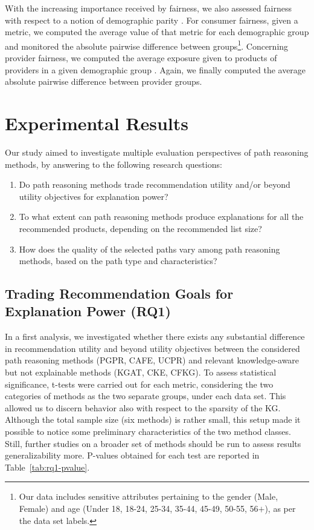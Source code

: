 \documentclass[runningheads]{llncs}
\begin{document}
With the increasing importance received by fairness, we also assessed fairness with respect to a notion of demographic parity \cite{10.1007/978-3-030-99736-6_37,DBLP:conf/sigir/GomezZBSM21}. 
For consumer fairness, given a metric, we computed the average value of that metric for each demographic group and monitored the absolute pairwise difference between groups\footnote{
Our data includes sensitive attributes pertaining to the gender (Male, Female) and age (Under 18, 18-24, 25-34, 35-44, 45-49, 50-55, 56$+$), as per the data set labels.
}.
Concerning provider fairness, we computed the average exposure given to products of providers in a given demographic group \cite{DBLP:journals/umuai/BorattoFM21}.
Again, we finally computed the average absolute pairwise difference between provider groups. 

\section{Experimental Results}
Our study aimed to investigate multiple evaluation perspectives of path reasoning methods, by answering to the following research questions: 

\vspace{-1.5mm}
\begin{enumerate}[label=\textbf{RQ\arabic*},leftmargin=10mm]
    \item Do path reasoning methods trade recommendation utility and/or beyond utility objectives for explanation power? 
    \item To what extent can path reasoning methods produce explanations for all the recommended products, depending on the recommended list size? 
    \item How does the quality of the selected paths vary among path reasoning methods, based on the path type and characteristics?
\vspace{-4mm}
\end{enumerate}

\subsection{Trading Recommendation Goals for Explanation Power (RQ1)}
\label{sec:rq1}
In a first analysis, we investigated whether there exists any substantial difference in recommendation utility and beyond utility objectives  between the considered path reasoning methods (PGPR, CAFE, UCPR) and relevant knowledge-aware but not explainable methods (KGAT, CKE, CFKG). {\color{black} 
To assess statistical significance, t-tests were carried out for each metric, considering the two categories of methods as the two separate groups, under each data set. This allowed us to discern behavior also with respect to the sparsity of the KG.
Although the total sample size (six methods) is rather small, this setup made it possible to notice some preliminary characteristics of the two method classes. Still, further studies on a broader set of methods should be run to assess results generalizability more. 
P-values obtained for each test are reported in Table~\ref{tab:rq1-pvalue}.}
\end{document}
